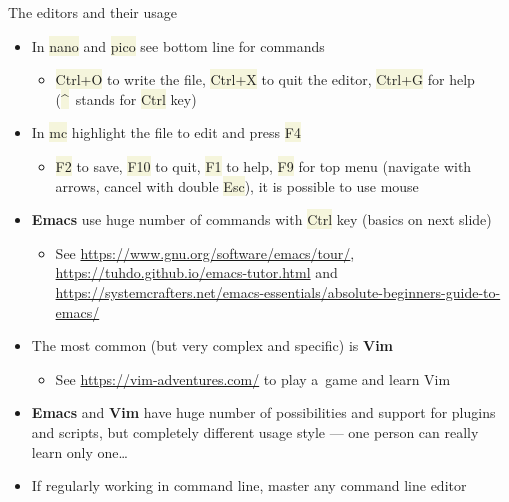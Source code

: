 \documentclass[compress, xelatex, 11pt, xcolor=svgnames, aspectratio=169,
	hyperref={
		bookmarks=true,
		unicode=true,
		colorlinks=true,
		pdftitle={Linux, command line and MetaCentrum},
		plainpages=false,
		pdfauthor={Vojtech Zeisek},
		pdfsubject={Course about use of Linux command line, writing shell scripts and using MetaCentrum of CESNET},
		pdfcreator={XeLaTeX},
		pdfkeywords={Linux, GNU, BASH, shell, command line, MetaCentrum},
		linkcolor=DarkRed, %
		anchorcolor=DarkBlue, %
		citecolor=Indigo, %
		filecolor=NavyBlue, %
		menucolor=DarkMagenta, %
		urlcolor=DarkBlue, %
		},
	url={hyphens, lowtilde} %
	]{beamer}
\renewcommand{\texttt}[1]{\colorbox{Beige}{{\ttfamily #1}}}
\begin{document}
\begin{frame}{The editors and their usage}
	\begin{itemize}
		\item In \texttt{nano} and \texttt{pico} see bottom line for commands
		\begin{itemize}
			\item \texttt{Ctrl+O} to write the file, \texttt{Ctrl+X} to quit the editor, \texttt{Ctrl+G} for help (\texttt{\textasciicircum}~stands for \texttt{Ctrl} key)
		\end{itemize}
		\item In \texttt{mc} highlight the file to edit and press \texttt{F4}
		\begin{itemize}
			\item \texttt{F2} to save, \texttt{F10} to quit, \texttt{F1} to help, \texttt{F9} for top menu (navigate with arrows, cancel with double \texttt{Esc}), it is possible to use mouse
		\end{itemize}
		\item \textbf{Emacs} use huge number of commands with \texttt{Ctrl} key (basics on next slide)
		\begin{itemize}
			\item See \url{https://www.gnu.org/software/emacs/tour/}, \url{https://tuhdo.github.io/emacs-tutor.html} and \url{https://systemcrafters.net/emacs-essentials/absolute-beginners-guide-to-emacs/}
		\end{itemize}
		\item The most common (but very complex and specific) is \textbf{Vim}
		\begin{itemize}
			\item See \url{https://vim-adventures.com/} to play a~game and learn Vim
		\end{itemize}
		\item \textbf{Emacs} and \textbf{Vim} have huge number of possibilities and support for plugins and scripts, but completely different usage style --- one person can really learn only one\ldots
		\item If regularly working in command line, master any command line editor
	\end{itemize}
\end{frame}
\end{document}
